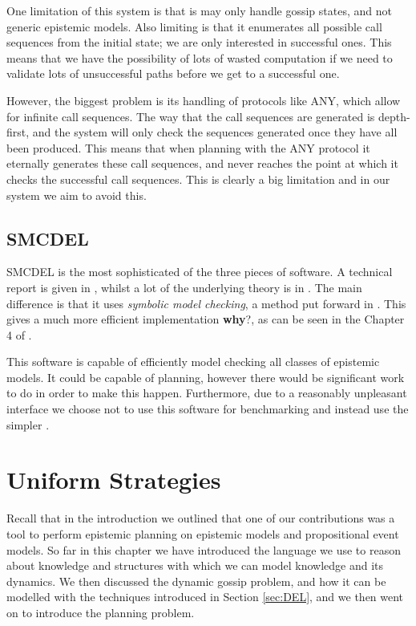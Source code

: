 \documentclass[10pt, a4paper]{report}
\begin{document}
One limitation of this system is that is may only handle gossip states, and not
generic epistemic models. Also limiting is that it enumerates all possible call
sequences from the initial state; we are only interested in successful ones.
This means that we have the possibility of lots of wasted computation if we need
to validate lots of unsuccessful paths before we get to a successful one.

However, the biggest problem is its handling of protocols like \textsf{ANY},
which allow for infinite call sequences. The way that the call sequences are
generated is depth-first, and the system will only check the sequences generated
once they have all been produced. This means that when planning with the
\textsf{ANY} protocol it eternally generates these call sequences, and never
reaches the point at which it checks the successful call sequences. This is
clearly a big limitation and in our system we aim to avoid this.

\subsection{SMCDEL}

SMCDEL is the most sophisticated of the three pieces of software. A technical
report is given in \cite{SMCDEL}, whilst a lot of the underlying theory is in
\cite{MalvinThesis}. The main difference is that it uses \emph{symbolic model
  checking}, a method put forward in \cite{SymbolicModelChecking}. This gives a
much more efficient implementation \textbf{why}?, as can be seen in the
Chapter 4 of \cite{MalvinThesis}.

This software is capable of efficiently model checking all classes of epistemic
models. It could be capable of planning, however there would be significant work
to do in order to make this happen. Furthermore, due to a reasonably unpleasant
interface we choose not to use this software for benchmarking and instead use
the simpler \cite{GithubGossip}.

\section{Uniform Strategies}
\label{sec:UniformStrategies}

Recall that in the introduction we outlined that one of our contributions was a
tool to perform epistemic planning on epistemic models and propositional event
models. So far in this chapter we have introduced the language we use to reason
about knowledge and structures with which we can model knowledge and its
dynamics. We then discussed the dynamic gossip problem, and how it can be
modelled with the techniques introduced in Section \ref{sec:DEL}, and we then
went on to introduce the planning problem. 
\end{document}
